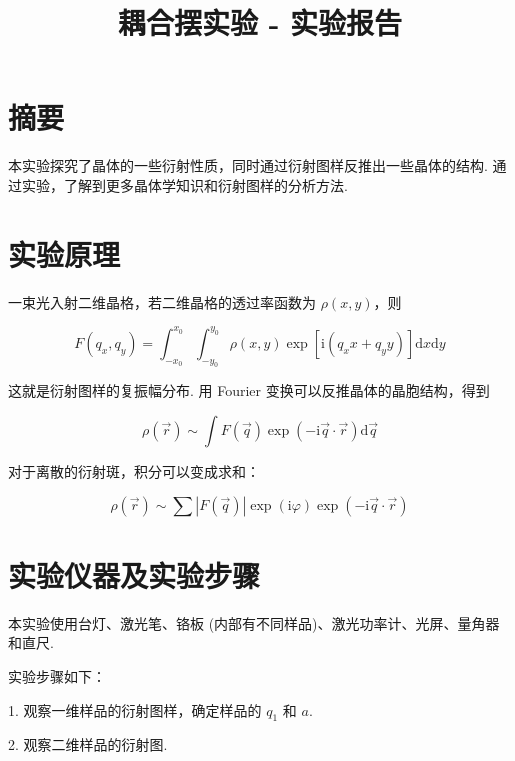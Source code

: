 \documentclass{customDoc}
\begin{document}
\title{耦合摆实验 - 实验报告}

\maketitle

\section{摘要}

本实验探究了晶体的一些衍射性质，同时通过衍射图样反推出一些晶体的结构. 通过实验，了解到更多晶体学知识和衍射图样的分析方法.

\section{实验原理}

一束光入射二维晶格，若二维晶格的透过率函数为 $\rho(x,y)$，则

\begin{equation}
    F(q_x, q_y) = \int_{-x_0}^{x_0}\int_{-y_0}^{y_0} \rho(x,y)\exp[\text{i}(q_xx+q_yy)]\text{d}x\text{d}y
\end{equation}

这就是衍射图样的复振幅分布. 用 Fourier 变换可以反推晶体的晶胞结构，得到

\begin{equation}
    \rho(\vec{r}) \sim \int F(\vec{q})\exp(-\text{i}\vec{q}\cdot\vec{r})\text{d}\vec{q}
\end{equation}

对于离散的衍射斑，积分可以变成求和：

\begin{equation}
    \rho(\vec{r}) \sim \sum|F(\vec{q})|\exp(\text{i}\varphi)\exp(-\text{i}\vec{q}\cdot\vec{r})
\end{equation}

\section{实验仪器及实验步骤}

本实验使用台灯、激光笔、铬板 (内部有不同样品)、激光功率计、光屏、量角器和直尺.\newline


实验步骤如下：\newline


1. 观察一维样品的衍射图样，确定样品的 $q_1$ 和 $a$.

2. 观察二维样品的衍射图.
\end{document}
